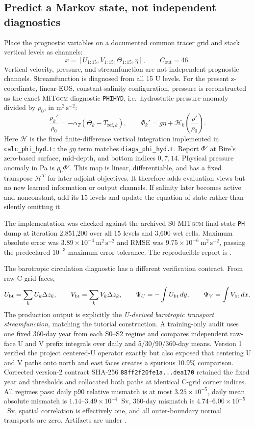 \documentclass[11pt]{article}
\newcommand{\MITgcm}{\textsc{MITgcm}}
\begin{document}
\subsection{Predict a Markov state, not independent diagnostics}
Place the prognostic variables on a documented common tracer grid and stack vertical
levels as channels:
\[
x=[U_{1:15},V_{1:15},\Theta_{1:15},\eta],
\qquad C_{\mathrm{out}}=46.
\]
Vertical velocity, pressure, and streamfunction are not independent prognostic channels.
Streamfunction is diagnosed from all 15 U levels.  For the present z-coordinate,
linear-EOS, constant-salinity configuration, pressure is reconstructed as the exact
\MITgcm{} diagnostic \texttt{PHIHYD}, i.e.\ hydrostatic pressure anomaly divided by
\(\rho_0\), in \(\mathrm{m^2\,s^{-2}}\):
\[
\frac{\rho_k'}{\rho_0}=-\alpha_T(\Theta_k-T_{\mathrm{ref},k}),\qquad
\Phi_k'=g\eta+\mathcal{H}_k\!\left(\frac{\rho'}{\rho_0}\right).
\]
Here \(\mathcal{H}\) is the fixed finite-difference vertical integration implemented in
\texttt{calc\_phi\_hyd.F}; the \(g\eta\) term matches \texttt{diags\_phi\_hyd.F}.
Report \(\Phi'\) at Bire's zero-based surface, mid-depth, and bottom indices
\(0,7,14\).  Physical pressure anomaly in Pa is \(\rho_0\Phi'\).  This map is linear,
differentiable, and has a fixed transpose \(\mathcal{H}^T\) for later adjoint objectives.
It therefore adds evaluation views but no new learned information or output channels.
If salinity later becomes active and nonconstant, add its 15 levels and update the
equation of state rather than silently omitting it.

The implementation was checked against the archived S0 \MITgcm{} final-state
\texttt{PH} dump at iteration 2,851,200 over all 15 levels and 3,600 wet cells.
Maximum absolute error was \(3.89\times10^{-4}\ \mathrm{m^2\,s^{-2}}\) and RMSE was
\(9.75\times10^{-6}\ \mathrm{m^2\,s^{-2}}\), passing the predeclared
\(10^{-3}\) maximum-error tolerance.  The reproducible report is
.

The barotropic circulation diagnostic has a different verification contract.  From
raw C-grid faces,
\[
U_{\rm bt}=\sum_k U_k\Delta z_k,\qquad
V_{\rm bt}=\sum_k V_k\Delta z_k,\qquad
\Psi_U=-\int U_{\rm bt}\,dy,\qquad
\Psi_V=\int V_{\rm bt}\,dx .
\]
The production output is explicitly the \emph{U-derived barotropic transport
streamfunction}, matching the tutorial construction.  A training-only audit uses one
fixed 360-day year from each S0--S2 regime and compares independent raw-face U and V
prefix integrals over daily and 5/30/90/360-day means.  Version 1 verified the project
centered-U operator exactly but also exposed that centering U and V paths onto north
and east faces creates a spurious 10.9\% comparison.  Corrected version-2 contract
SHA-256 \texttt{88ff2f20fe1a...dea170} retained the fixed year and thresholds and
collocated both paths at identical C-grid corner indices.  All regimes pass: daily
p90 relative mismatch is at most \(3.25\times10^{-5}\), daily mean absolute mismatch
is \(1.14\)--\(3.49\times10^{-4}\)~Sv, 360-day mismatch is
\(4.74\)--\(6.00\times10^{-5}\)~Sv, spatial correlation is effectively one, and all
outer-boundary normal transports are zero.  Artifacts are under
.
\end{document}
